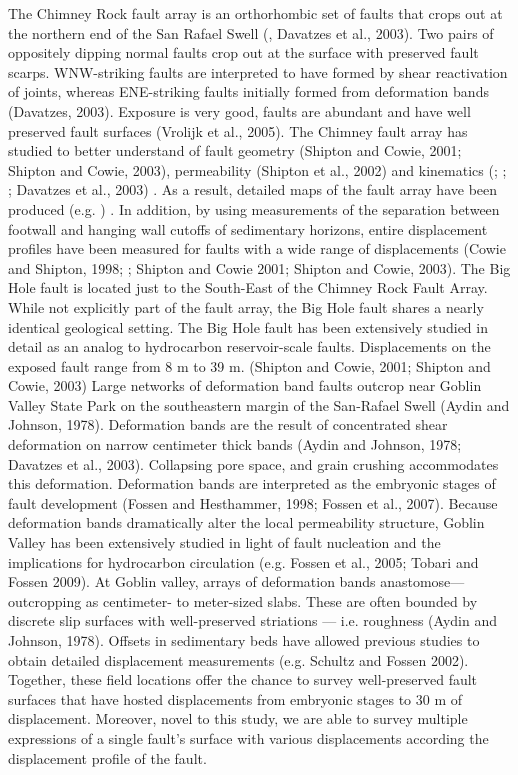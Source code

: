 \documentclass[12pt,a4paper]{article}
\begin{document}
The Chimney Rock fault array is an orthorhombic set of faults that crops out at the northern end of the San Rafael Swell (\cite{krantz1986orthorhombic}, Davatzes et al., 2003). Two pairs of oppositely dipping normal faults crop out at the surface with preserved fault scarps. WNW-striking faults are interpreted to have formed by shear reactivation of joints, whereas ENE-striking faults initially formed from deformation bands (Davatzes, 2003). Exposure is very good, faults are abundant and have well preserved fault surfaces (Vrolijk et al., 2005). The Chimney fault array has studied to better understand of fault geometry (Shipton and Cowie, 2001; Shipton and Cowie, 2003), permeability (Shipton et al., 2002) and kinematics (\cite{krantz1986orthorhombic}; \cite{krantz1986orthorhombic}; \cite{maerten2001digital}; Davatzes et al., 2003) . As a result, detailed maps of the fault array have been produced (e.g. \cite{maerten2001digital}) . In addition, by using measurements of the separation between footwall and hanging wall cutoffs of sedimentary horizons, entire displacement profiles have been measured for faults with a wide range of displacements (Cowie and Shipton, 1998; \cite{maerten2001digital}; Shipton and Cowie 2001; Shipton and Cowie, 2003). 
The Big Hole fault is located just to the South-East of the Chimney Rock Fault Array. While not explicitly part of the fault array, the Big Hole fault shares a nearly identical geological setting. The Big Hole fault has been extensively studied in detail as an analog to hydrocarbon reservoir-scale faults. Displacements on the exposed fault range from 8 m to 39 m. (Shipton and Cowie, 2001; Shipton and Cowie, 2003) 
	Large networks of deformation band faults outcrop near Goblin Valley State Park on the southeastern margin of the San-Rafael Swell (Aydin and Johnson, 1978). Deformation bands are the result of concentrated shear deformation on narrow centimeter thick bands (Aydin and Johnson, 1978; Davatzes et al., 2003). Collapsing pore space, and grain crushing accommodates this deformation. Deformation bands are interpreted as the embryonic stages of fault development (Fossen and Hesthammer, 1998; Fossen et al., 2007). Because deformation bands dramatically alter the local permeability structure, Goblin Valley has been extensively studied in light of fault nucleation and the implications for hydrocarbon circulation (e.g. Fossen et al., 2005; Tobari and Fossen 2009). At Goblin valley, arrays of deformation bands anastomose—outcropping as centimeter- to meter-sized slabs.  These are often bounded by discrete slip surfaces with well-preserved striations — i.e. roughness (Aydin and Johnson, 1978). Offsets in sedimentary beds have allowed previous studies to obtain detailed displacement measurements (e.g. Schultz and Fossen 2002). 
Together, these field locations offer the chance to survey well-preserved fault surfaces that have hosted displacements from embryonic stages to 30 m of displacement. Moreover, novel to this study, we are able to survey multiple expressions of a single fault’s surface with various displacements according the displacement profile of the fault. 
\end{document}
